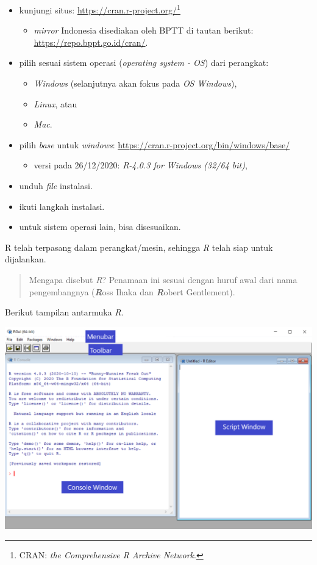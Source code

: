 \documentclass[
  12pt,
  a4paper,
]{scrbook}
\providecommand{\tightlist}{%
  \setlength{\itemsep}{0pt}\setlength{\parskip}{0pt}}
\begin{document}
\begin{itemize}
\tightlist
\item
  kunjungi situs: \url{https://cran.r-project.org/}\footnote{CRAN:
    \emph{the Comprehensive R Archive Network}.}

  \begin{itemize}
  \tightlist
  \item
    \emph{mirror} Indonesia disediakan oleh BPTT di tautan berikut:
    \url{https://repo.bppt.go.id/cran/}.
  \end{itemize}
\item
  pilih sesuai sistem operasi (\emph{operating system - OS}) dari
  perangkat:

  \begin{itemize}
  \tightlist
  \item
    \emph{Windows} (selanjutnya akan fokus pada \emph{OS Windows}),
  \item
    \emph{Linux}, atau
  \item
    \emph{Mac}.
  \end{itemize}
\item
  pilih \emph{base} untuk \emph{windows}:
  \url{https://cran.r-project.org/bin/windows/base/}

  \begin{itemize}
  \tightlist
  \item
    versi pada 26/12/2020: \emph{R-4.0.3 for Windows (32/64 bit)},
  \end{itemize}
\item
  unduh \emph{file} instalasi.
\item
  ikuti langkah instalasi.
\item
  untuk sistem operasi lain, bisa disesuaikan.
\end{itemize}

R telah terpasang dalam perangkat/mesin, sehingga \emph{R} telah siap
untuk dijalankan.

\begin{quote}
Mengapa disebut \emph{R}? Penamaan ini sesuai dengan huruf awal dari
nama pengembangnya (\emph{\textbf{R}}oss Ihaka dan
\emph{\textbf{R}}obert Gentlement).
\end{quote}

\newpage

Berikut tampilan antarmuka \emph{R}.

\includegraphics{fig_r0.png}
\end{document}
